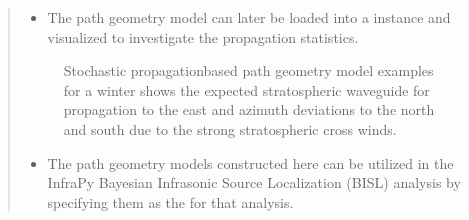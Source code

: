 \documentclass[letterpaper,10pt,english]{sphinxmanual}
\let\sphinxpxdimen\pdfpxdimen\else\newdimen\sphinxpxdimen
\begin{document}
\begin{itemize}
\begin{quote}
\begin{itemize}
\end{itemize}

\begin{sphinxVerbatim}[commandchars=\\\{\}]
  
   
\end{sphinxVerbatim}
\begin{itemize}
\item {} 
The path geometry model can later be loaded into a  instance and visualized to investigate the propagation statistics.

\end{itemize}

\begin{sphinxVerbatim}[commandchars=\\\{\}]
 
\end{sphinxVerbatim}

\begin{figure}[htbp]
\centering
\capstart

\noindent\sphinxincludegraphics[width=850\sphinxpxdimen]{{winter-PGMs}.jpg}
\caption{Stochastic propagation\sphinxhyphen{}based path geometry model examples for a winter shows the expected stratospheric waveguide for propagation to the east and azimuth deviations to the north and south due to the strong stratospheric cross winds.}\label{\detokenize{propagation:id3}}\end{figure}
\begin{itemize}
\item {} 
The path geometry models constructed here can be utilized in the InfraPy Bayesian Infrasonic Source Localization (BISL) analysis by specifying them as the  for that analysis.


\end{itemize}
\end{quote}
\end{itemize}
\end{document}
